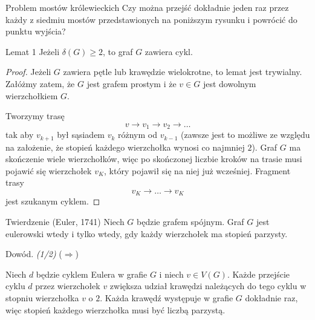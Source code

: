 \documentclass[a4paper,10pt]{beamer}
\begin{document}
\begin{frame}

\begin{block}{Problem mostów królewieckich}
Czy można przejść dokładnie jeden raz przez każdy z siedmiu mostów przedstawionych na poniższym rysunku i powrócić do punktu wyjścia?
\end{block}
\begin{center}
	

\begin{footnotesize}\end{footnotesize}
\end{center}

\end{frame}




\begin{frame}
	\begin{block}{Lemat 1}
Jeżeli $\delta(G)\geqslant2$, to graf $G$ zawiera cykl.
	\end{block}
\begin{proof}
Jeżeli $G$ zawiera pętle lub krawędzie wielokrotne, to lemat jest trywialny. Załóżmy zatem, że $G$ jest grafem prostym i że $v\in G$ jest dowolnym wierzchołkiem $G$.

Tworzymy trasę $$v\to v_1\to v_2\to\ldots$$
tak aby $v_{k+1}$ był sąsiadem $v_k$ różnym od $v_{k-1}$ (zawsze jest to możliwe ze względu na założenie, że stopień każdego wierzchołka wynosi co najmniej $2$). Graf $G$ ma skończenie wiele wierzchołków, więc po skończonej liczbie kroków na trasie musi pojawić się wierzchołek $v_K$, który pojawił się na niej już wcześniej. Fragment trasy $$v_K\to\ldots\to v_K$$ jest szukanym cyklem.
\end{proof}	
\end{frame}





\begin{frame}
	\begin{block}{Twierdzenie (Euler, 1741)}
Niech $G$ będzie grafem spójnym. Graf $G$ jest eulerowski wtedy i tylko wtedy, gdy każdy wierzchołek ma stopień parzysty.
	\end{block}
\begin{block}{Dowód. {\it (1/2)}}
($\Rightarrow$)

Niech $d$ będzie cyklem Eulera w grafie $G$ i niech $v\in V(G)$. Każde przejście cyklu $d$ przez wierzchołek $v$ zwiększa udział krawędzi należących do tego cyklu w stopniu wierzchołka $v$ o $2$. Każda krawędź występuje w grafie $G$ dokładnie raz, więc stopień każdego wierzchołka musi być liczbą parzystą.
\end{block}	
\end{frame}
\end{document}
